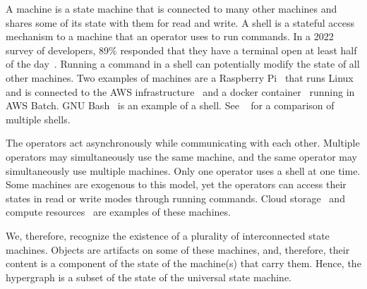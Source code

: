 A machine is a state machine that is connected to many other machines and shares some of its state with them for read and write. A shell is a stateful access mechanism to a machine that an operator uses to run commands. In a 2022 survey of developers, 89\% responded that they have a terminal open at least half of the day~\cite{textualize_founded}. Running a command in a shell can potentially modify the state of all other machines. Two examples of machines are a Raspberry Pi~\cite{rpi} that runs Linux and is connected to the AWS infrastructure~\cite{aws} and a docker container~\cite{docker} running in AWS Batch. GNU Bash~\cite{gnu_bash} is an example of a shell. See ~\cite{greenberg2019} for a comparison of multiple shells.

The operators act asynchronously while communicating with each other. Multiple operators may simultaneously use the same machine, and the same operator may simultaneously use multiple machines. Only one operator uses a shell at one time. Some machines are exogenous to this model, yet the operators can access their states in read or write modes through running commands. Cloud storage~\cite{aws_s3} and compute resources~\cite{aws_batch} are examples of these machines.

We, therefore, recognize the existence of a plurality of interconnected state machines. Objects are artifacts on some of these machines, and, therefore, their content is a component of the state of the machine(s) that carry them. Hence, the hypergraph is a subset of the state of the universal state machine.